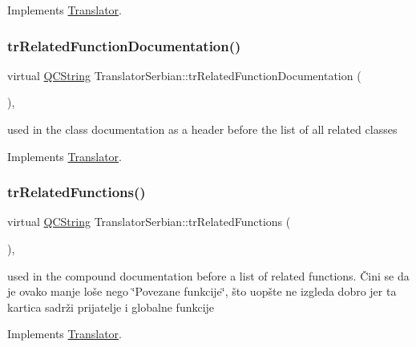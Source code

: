 Implements \mbox{\hyperlink{class_translator}{Translator}}.

\mbox{\label{class_translator_serbian_ab5710c1dd824255780ede7d8068bd2fe}} 
\subsubsection{\texorpdfstring{trRelatedFunctionDocumentation()}{trRelatedFunctionDocumentation()}}
{\footnotesize\ttfamily virtual \mbox{\hyperlink{class_q_c_string}{Q\+C\+String}} Translator\+Serbian\+::tr\+Related\+Function\+Documentation (\begin{DoxyParamCaption}{ }\end{DoxyParamCaption})\hspace{0.3cm}{\ttfamily [inline]}, {\ttfamily [virtual]}}

used in the class documentation as a header before the list of all related classes 

Implements \mbox{\hyperlink{class_translator}{Translator}}.

\mbox{\label{class_translator_serbian_acc0e53868672f3f9243867a686b9e4a9}} 
\subsubsection{\texorpdfstring{trRelatedFunctions()}{trRelatedFunctions()}}
{\footnotesize\ttfamily virtual \mbox{\hyperlink{class_q_c_string}{Q\+C\+String}} Translator\+Serbian\+::tr\+Related\+Functions (\begin{DoxyParamCaption}{ }\end{DoxyParamCaption})\hspace{0.3cm}{\ttfamily [inline]}, {\ttfamily [virtual]}}

used in the compound documentation before a list of related functions. Čini se da je ovako manje loše nego \char`\"{}\+Povezane funkcije\char`\"{}, što uopšte ne izgleda dobro jer ta kartica sadrži prijatelje i globalne funkcije 

Implements \mbox{\hyperlink{class_translator}{Translator}}.

